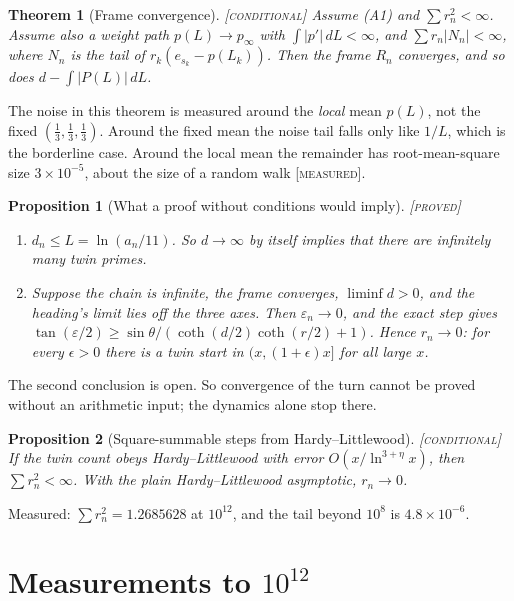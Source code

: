 \documentclass[11pt]{article}
\newtheorem{theorem}{Theorem}
\newtheorem{proposition}{Proposition}
\theoremstyle{definition}
\theoremstyle{remark}
\newcommand{\grade}[1]{\textsc{[#1]}}
\begin{document}
\begin{theorem}[Frame convergence] \grade{conditional}
Assume (A1) and $\sum r_n^2<\infty$. Assume also a weight path $p(L)\to p_\infty$ with $\int|p'|\,dL<\infty$, and $\sum r_n|N_n|<\infty$, where $N_n$ is the tail of $r_k(e_{s_k}-p(L_k))$. Then the frame $R_n$ converges, and so does $d-\int|P(L)|\,dL$.
\end{theorem}

\noindent The noise in this theorem is measured around the \emph{local} mean $p(L)$, not the fixed $(\tfrac13,\tfrac13,\tfrac13)$. Around the fixed mean the noise tail falls only like $1/L$, which is the borderline case. Around the local mean the remainder has root-mean-square size $3\times10^{-5}$, about the size of a random walk \grade{measured}.

\begin{proposition}[What a proof without conditions would imply] \grade{proved}
\begin{enumerate}
\item $d_n\le L=\ln(a_n/11)$. So $d\to\infty$ by itself implies that there are infinitely many twin primes.
\item Suppose the chain is infinite, the frame converges, $\liminf d>0$, and the heading's limit lies off the three axes. Then $\varepsilon_n\to0$, and the exact step gives $\tan(\varepsilon/2)\ge\sin\theta/(\coth(d/2)\coth(r/2)+1)$. Hence $r_n\to0$: for every $\epsilon>0$ there is a twin start in $(x,(1+\epsilon)x]$ for all large $x$.
\end{enumerate}
\end{proposition}
\noindent The second conclusion is open. So convergence of the turn cannot be proved without an arithmetic input; the dynamics alone stop there.

\begin{proposition}[Square-summable steps from Hardy--Littlewood] \grade{conditional}
If the twin count obeys Hardy--Littlewood with error $O(x/\ln^{3+\eta}x)$, then $\sum r_n^2<\infty$. With the plain Hardy--Littlewood asymptotic, $r_n\to0$.
\end{proposition}
\noindent Measured: $\sum r_n^2=1.2685628$ at $10^{12}$, and the tail beyond $10^8$ is $4.8\times10^{-6}$.

\section{Measurements to $10^{12}$}
\end{document}
